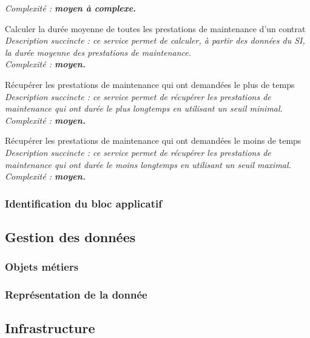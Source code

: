 \begin{description}
        \it{Complexité :} \bf{moyen} à \bf{complexe}.
    \item[\textbullet] Calculer la durée moyenne de toutes les prestations de maintenance d’un contrat \\
        \it{Description succincte :} ce service permet de calculer, à partir des données du SI, la durée moyenne des prestations de maintenance. \\
        \it{Complexité :} \bf{moyen}.
    \item[\textbullet] Récupérer les prestations de maintenance qui ont demandées le plus de temps \\
        \it{Description succincte :} ce service permet de récupérer les prestations de maintenance qui ont durée le plus longtemps en utilisant un seuil minimal. \\
        \it{Complexité :} \bf{moyen}.
    \item[\textbullet] Récupérer les prestations de maintenance qui ont demandées le moins de temps \\
        \it{Description succincte :} ce service permet de récupérer les prestations de maintenance qui ont durée le moins longtemps en utilisant un seuil maximal. \\
        \it{Complexité :} \bf{moyen}.
\end{description}

\subsubsection{Identification du bloc applicatif}


\subsection{Gestion des données}

\subsubsection{Objets métiers}


\subsubsection{Représentation de la donnée}


\subsection{Infrastructure}

